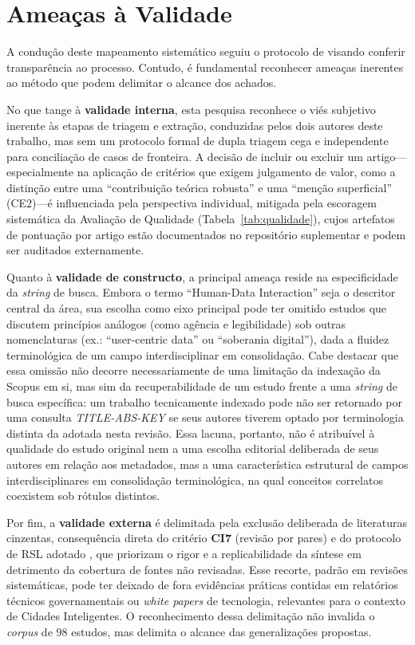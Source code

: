 \documentclass[12pt]{article}
\begin{document}
    \section{Ameaças à Validade}
    \label{sec:ameacas}

    A condução deste mapeamento sistemático seguiu o protocolo de \cite{KITCHENHAM2013} visando conferir transparência ao processo. Contudo, é fundamental reconhecer ameaças inerentes ao método que podem delimitar o alcance dos achados.

    No que tange à \textbf{validade interna}, esta pesquisa reconhece o viés subjetivo inerente às etapas de triagem e extração, conduzidas pelos dois autores deste trabalho, mas sem um protocolo formal de dupla triagem cega e independente para conciliação de casos de fronteira. A decisão de incluir ou excluir um artigo---especialmente na aplicação de critérios que exigem julgamento de valor, como a distinção entre uma ``contribuição teórica robusta'' e uma ``menção superficial'' (CE2)---é influenciada pela perspectiva individual, mitigada pela escoragem sistemática da Avaliação de Qualidade (Tabela~\ref{tab:qualidade}), cujos artefatos de pontuação por artigo estão documentados no repositório suplementar e podem ser auditados externamente.

    Quanto à \textbf{validade de constructo}, a principal ameaça reside na especificidade da \textit{string} de busca. Embora o termo ``Human-Data Interaction'' seja o descritor central da área, sua escolha como eixo principal pode ter omitido estudos que discutem princípios análogos (como agência e legibilidade) sob outras nomenclaturas (ex.: ``user-centric data'' ou ``soberania digital''), dada a fluidez terminológica de um campo interdisciplinar em consolidação. Cabe destacar que essa omissão não decorre necessariamente de uma limitação da indexação da Scopus em si, mas sim da recuperabilidade de um estudo frente a uma \textit{string} de busca específica: um trabalho tecnicamente indexado pode não ser retornado por uma consulta \textit{TITLE-ABS-KEY} se seus autores tiverem optado por terminologia distinta da adotada nesta revisão. Essa lacuna, portanto, não é atribuível à qualidade do estudo original nem a uma escolha editorial deliberada de seus autores em relação aos metadados, mas a uma característica estrutural de campos interdisciplinares em consolidação terminológica, na qual conceitos correlatos coexistem sob rótulos distintos.

    Por fim, a \textbf{validade externa} é delimitada pela exclusão deliberada de literaturas cinzentas, consequência direta do critério \textbf{CI7} (revisão por pares) e do protocolo de RSL adotado \cite{KITCHENHAM2013}, que priorizam o rigor e a replicabilidade da síntese em detrimento da cobertura de fontes não revisadas. Esse recorte, padrão em revisões sistemáticas, pode ter deixado de fora evidências práticas contidas em relatórios técnicos governamentais ou \textit{white papers} de tecnologia, relevantes para o contexto de Cidades Inteligentes. O reconhecimento dessa delimitação não invalida o \textit{corpus} de 98 estudos, mas delimita o alcance das generalizações propostas.
\end{document}
